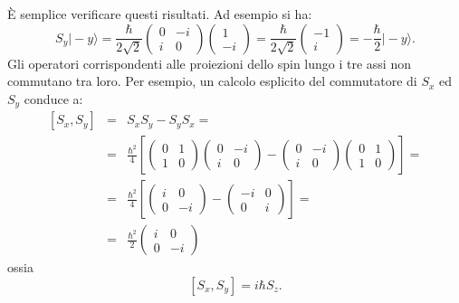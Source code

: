 È semplice verificare questi risultati. Ad esempio si ha:
\begin{equation}
S_y \vert - y \rangle = \frac{\hbar}{2\sqrt{2}}\begin{pmatrix}
0 & -i\\
i & 0
\end{pmatrix}
\begin{pmatrix}
1\\-i
\end{pmatrix} = \frac{\hbar}{2\sqrt{2}} 
\begin{pmatrix}
-1 \\ i
\end{pmatrix} = -\frac{\hbar}{2} \vert -y \rangle .
\end{equation}
Gli operatori corrispondenti alle proiezioni dello spin lungo i tre assi non commutano tra loro. Per esempio, un calcolo esplicito del commutatore di $S_x$ ed $S_y$ conduce a:
\begin{eqnarray}
\left[ S_x , S_y \right] & = & S_x S_y-S_y S_x= \nonumber \\
& = &\frac{\hbar ^2}{4} \left[\begin{pmatrix}
0 & 1\\
1 & 0
\end{pmatrix} \begin{pmatrix}
0 & -i\\
i & 0
\end{pmatrix}- \begin{pmatrix}
0 & -i\\
i & 0
\end{pmatrix}\begin{pmatrix}
0 & 1\\
1 & 0
\end{pmatrix}
\right] = \\
& = &\frac{\hbar ^2}{4} \left[\begin{pmatrix}
i & 0\\
0 & -i
\end{pmatrix} - \begin{pmatrix}
-i & 0\\
0 & i
\end{pmatrix}\right] = \nonumber \\
& = & \frac{\hbar ^2}{2}\begin{pmatrix}
i & 0\\
0 & -i
\end{pmatrix}\nonumber
\end{eqnarray}
ossia
\begin{equation}
\left[ S_x, S_y \right] = i \hbar S_z.
\end{equation}
